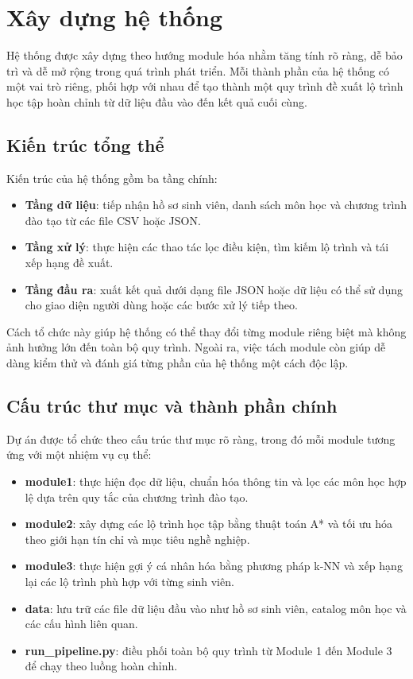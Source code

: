 \section{Xây dựng hệ thống}
\label{sec:xay_dung_he_thong}

Hệ thống được xây dựng theo hướng module hóa nhằm tăng tính rõ ràng, dễ bảo trì và dễ mở rộng trong quá trình phát triển. Mỗi thành phần của hệ thống có một vai trò riêng, phối hợp với nhau để tạo thành một quy trình đề xuất lộ trình học tập hoàn chỉnh từ dữ liệu đầu vào đến kết quả cuối cùng.

\subsection{Kiến trúc tổng thể}

Kiến trúc của hệ thống gồm ba tầng chính:
\begin{itemize}
    \item \textbf{Tầng dữ liệu}: tiếp nhận hồ sơ sinh viên, danh sách môn học và chương trình đào tạo từ các file CSV hoặc JSON.
    \item \textbf{Tầng xử lý}: thực hiện các thao tác lọc điều kiện, tìm kiếm lộ trình và tái xếp hạng đề xuất.
    \item \textbf{Tầng đầu ra}: xuất kết quả dưới dạng file JSON hoặc dữ liệu có thể sử dụng cho giao diện người dùng hoặc các bước xử lý tiếp theo.
\end{itemize}

Cách tổ chức này giúp hệ thống có thể thay đổi từng module riêng biệt mà không ảnh hưởng lớn đến toàn bộ quy trình. Ngoài ra, việc tách module còn giúp dễ dàng kiểm thử và đánh giá từng phần của hệ thống một cách độc lập.

\subsection{Cấu trúc thư mục và thành phần chính}

Dự án được tổ chức theo cấu trúc thư mục rõ ràng, trong đó mỗi module tương ứng với một nhiệm vụ cụ thể:
\begin{itemize}
    \item \textbf{module1}: thực hiện đọc dữ liệu, chuẩn hóa thông tin và lọc các môn học hợp lệ dựa trên quy tắc của chương trình đào tạo.
    \item \textbf{module2}: xây dựng các lộ trình học tập bằng thuật toán A* và tối ưu hóa theo giới hạn tín chỉ và mục tiêu nghề nghiệp.
    \item \textbf{module3}: thực hiện gợi ý cá nhân hóa bằng phương pháp k-NN và xếp hạng lại các lộ trình phù hợp với từng sinh viên.
    \item \textbf{data}: lưu trữ các file dữ liệu đầu vào như hồ sơ sinh viên, catalog môn học và các cấu hình liên quan.
    \item \textbf{run\_pipeline.py}: điều phối toàn bộ quy trình từ Module 1 đến Module 3 để chạy theo luồng hoàn chỉnh.
\end{itemize}

